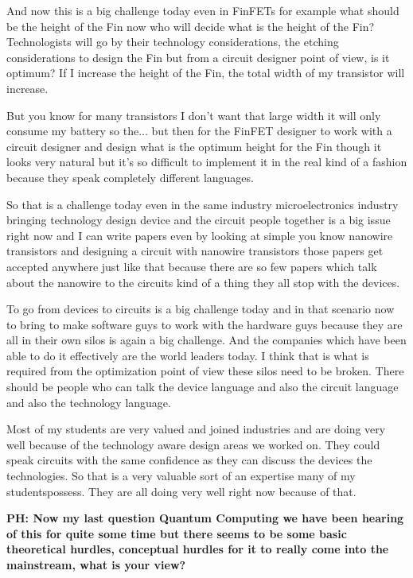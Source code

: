 \begin{multicols}{2}
And now this is a big challenge today even in FinFETs for example what should be the height of the Fin now who will decide what is the height of the Fin? Technologists will go by their technology considerations, the etching considerations to design the Fin but from a circuit designer point of view, is it optimum? If I increase the height of the Fin, the total width of my transistor will increase.

But you know for many transistors I don’t want that large width it will only consume my battery so the... but then for the FinFET designer to work with a circuit designer and design what is the optimum height for the Fin though it looks very natural but it’s so difficult to implement it in the real kind of a fashion because they speak completely different languages.

So that is a challenge today even in the same industry microelectronics industry bringing technology design device and the circuit people together is a big issue right now and I can write papers even by looking at simple you know nanowire transistors and designing a circuit with nanowire transistors those papers get accepted anywhere just like that because there are so few papers which talk about the nanowire to the circuits kind of a thing they all stop with the devices.

To go from devices to circuits is a big challenge today and in that scenario now to bring to make software guys to work with the hardware guys because they are all in their own silos is again a big challenge. And the companies which have been able to do it effectively are the world leaders today. I think that is what is required from the optimization point of view these silos need to be broken. There should be people who can talk the device language and also the circuit language and also the technology language.

Most of my students are very valued and joined industries and are doing very well because of the technology aware design areas we worked on. They could speak circuits with the same confidence as they can discuss the devices the technologies. So that is a very valuable sort of an expertise many of my studentspossess. They are all doing very well right now because of that.

\textbf{PH: Now my last question Quantum Computing we have been hearing of this for quite some time but there seems to be some basic theoretical hurdles, conceptual hurdles for it to really come into the mainstream, what is your view?}


\end{multicols}
